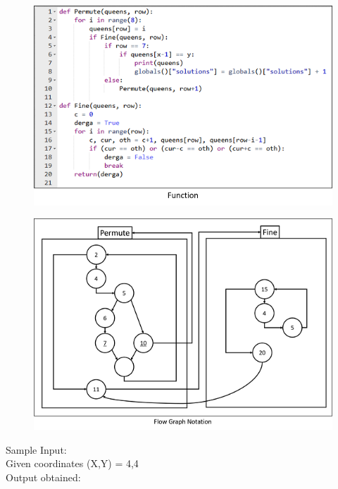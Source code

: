 \documentclass[a4paper,12pt]{article}
\begin{document}
		\begin{figure}[h!]
			\centering
			\includegraphics{quee.png}
			\end{figure}	
			
			\begin{figure}[h!]
				\centering
				\includegraphics{qu.png}
				\end{figure}
				
				\noindent
				Sample Input:\\
				Given coordinates (X,Y) = 4,4\\
				\noindent
				Output obtained:\\
				
\end{document}
